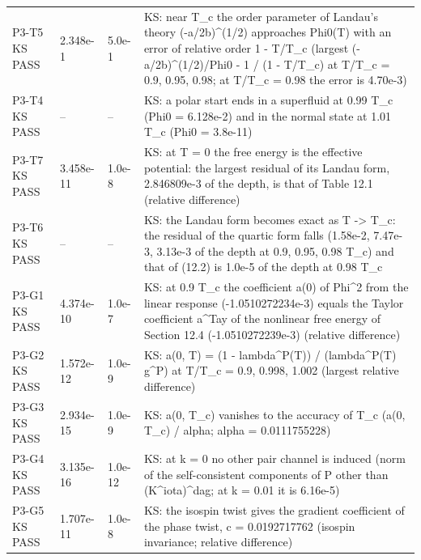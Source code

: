 \documentclass[aps,prd,onecolumn,superscriptaddress,nofootinbib,floatfix,longbibliography]{revtex4-2}
\begin{document}
\begin{longtable}{p{}p{}p{}p{}}
P3-T5 KS \newline PASS & 2.348e-1 & 5.0e-1 & KS: near T\_c the order parameter of Landau's theory (-a/2b)\textasciicircum{}(1/2) approaches Phi0(T) with an error of relative order 1 - T/T\_c (largest \textbar{}(-a/2b)\textasciicircum{}(1/2)/Phi0 - 1\textbar{} / (1 - T/T\_c) at T/T\_c = 0.9, 0.95, 0.98; at T/T\_c = 0.98 the error is 4.70e-3) \\
P3-T4 KS \newline PASS & -- & -- & KS: a polar start ends in a superfluid at 0.99 T\_c (Phi0 = 6.128e-2) and in the normal state at 1.01 T\_c (Phi0 = 3.8e-11) \\
P3-T7 KS \newline PASS & 3.458e-11 & 1.0e-8 & KS: at T = 0 the free energy is the effective potential: the largest residual of its Landau form, 2.846809e-3 of the depth, is that of Table 12.1 (relative difference) \\
P3-T6 KS \newline PASS & -- & -- & KS: the Landau form becomes exact as T -\textgreater{} T\_c: the residual of the quartic form falls (1.58e-2, 7.47e-3, 3.13e-3 of the depth at 0.9, 0.95, 0.98 T\_c) and that of (12.2) is 1.0e-5 of the depth at 0.98 T\_c \\
P3-G1 KS \newline PASS & 4.374e-10 & 1.0e-7 & KS: at 0.9 T\_c the coefficient a(0) of \textbar{}Phi\textbar{}\textasciicircum{}2 from the linear response (-1.0510272234e-3) equals the Taylor coefficient a\textasciicircum{}Tay of the nonlinear free energy of Section 12.4 (-1.0510272239e-3) (relative difference) \\
P3-G2 KS \newline PASS & 1.572e-12 & 1.0e-9 & KS: a(0, T) = (1 - lambda\textasciicircum{}P(T)) / (lambda\textasciicircum{}P(T) g\textasciicircum{}P) at T/T\_c = 0.9, 0.998, 1.002 (largest relative difference) \\
P3-G3 KS \newline PASS & 2.934e-15 & 1.0e-9 & KS: a(0, T\_c) vanishes to the accuracy of T\_c (\textbar{}a(0, T\_c)\textbar{} / alpha; alpha = 0.0111755228) \\
P3-G4 KS \newline PASS & 3.135e-16 & 1.0e-12 & KS: at k = 0 no other pair channel is induced (norm of the self-consistent components of P other than (K\textasciicircum{}iota)\textasciicircum{}dag; at k = 0.01 it is 6.16e-5) \\
P3-G5 KS \newline PASS & 1.707e-11 & 1.0e-8 & KS: the isospin twist gives the gradient coefficient of the phase twist, c = 0.0192717762 (isospin invariance; relative difference) \\

\end{longtable}
\end{document}
